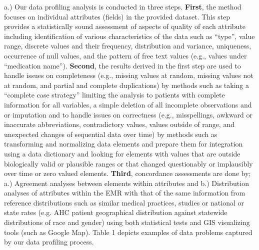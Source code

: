 \documentclass{article}
\begin{document}
a.) Our data profiling analysis is conducted in three steps.  
\textbf{First}, the method focuses on individual attributes (fields) in the provided dataset.  This step provides a statistically sound assessment of aspects of quality of each attribute including identification of various characteristics of the data such as ``type'', value range, discrete values and their frequency, distribution and variance, uniqueness, occurrence of null values, and the pattern of free text values (e.g., values under ``medication name''). 
\textbf{Second},   the results derived in the first step   are used to handle issues on completeness (e.g., missing values at random, missing values not at random, and partial and complete duplications) by methods such as taking a ``complete case strategy'' limiting the analysis to patients with complete information for all variables, a simple deletion of all incomplete observations and or imputation and to handle issues on correctness (e.g., misspellings, awkward or inaccurate abbreviations, contradictory values, values outside of range, and unexpected changes of sequential data over time) by methods such as transforming and normalizing data elements and prepare them for integration using a data dictionary and looking for elements with values that are outside biologically valid or plausible ranges or that changed questionably or implausibly over time or zero valued elements. 
\textbf{Third}, concordance assessments are done by; a.) Agreement analyses between elements within attributes and b.) Distribution analyses of attributes within the EMR with that of the same information from reference distributions such as similar medical practices, studies or national or state rates (e.g. AHC patient geographical distribution against statewide distributions of race and gender) using both statistical tests and GIS visualizing tools (such as Google Map). Table 1 depicts examples of data problems captured by our data profiling process.
\end{document}
